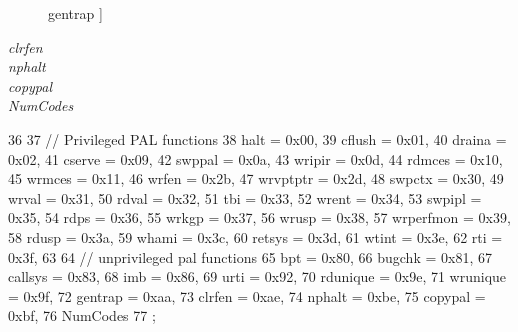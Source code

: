 \begin{Desc}
\begin{description}
{\hypertarget{structPAL_adf764cbdea00d65edcd07bb9953ad2b7a0ea5dc9a2948c3bcfb2a620bfd363503}{
gentrap}
\label{structPAL_adf764cbdea00d65edcd07bb9953ad2b7a0ea5dc9a2948c3bcfb2a620bfd363503}
}]\item[{\em 
\hypertarget{structPAL_adf764cbdea00d65edcd07bb9953ad2b7ae88ccf59a847278280a49eb4d9db613f}{
clrfen}
\label{structPAL_adf764cbdea00d65edcd07bb9953ad2b7ae88ccf59a847278280a49eb4d9db613f}
}]\item[{\em 
\hypertarget{structPAL_adf764cbdea00d65edcd07bb9953ad2b7ae8176a94c597d07e06974a88fa49f0db}{
nphalt}
\label{structPAL_adf764cbdea00d65edcd07bb9953ad2b7ae8176a94c597d07e06974a88fa49f0db}
}]\item[{\em 
\hypertarget{structPAL_adf764cbdea00d65edcd07bb9953ad2b7a1409cfe014ada6068553b669c0f6af5c}{
copypal}
\label{structPAL_adf764cbdea00d65edcd07bb9953ad2b7a1409cfe014ada6068553b669c0f6af5c}
}]\item[{\em 
\hypertarget{structPAL_adf764cbdea00d65edcd07bb9953ad2b7ae08c8ca254e0a08fa5478db2ceadfeaf}{
NumCodes}
\label{structPAL_adf764cbdea00d65edcd07bb9953ad2b7ae08c8ca254e0a08fa5478db2ceadfeaf}
}]\end{description}
\end{Desc}




\begin{DoxyCode}
36          {
37         // Privileged PAL functions
38         halt = 0x00,
39         cflush = 0x01,
40         draina = 0x02,
41         cserve = 0x09,
42         swppal = 0x0a,
43         wripir = 0x0d,
44         rdmces = 0x10,
45         wrmces = 0x11,
46         wrfen = 0x2b,
47         wrvptptr = 0x2d,
48         swpctx = 0x30,
49         wrval = 0x31,
50         rdval = 0x32,
51         tbi = 0x33,
52         wrent = 0x34,
53         swpipl = 0x35,
54         rdps = 0x36,
55         wrkgp = 0x37,
56         wrusp = 0x38,
57         wrperfmon = 0x39,
58         rdusp = 0x3a,
59         whami = 0x3c,
60         retsys = 0x3d,
61         wtint = 0x3e,
62         rti = 0x3f,
63 
64         // unprivileged pal functions
65         bpt = 0x80,
66         bugchk = 0x81,
67         callsys = 0x83,
68         imb = 0x86,
69         urti = 0x92,
70         rdunique = 0x9e,
71         wrunique = 0x9f,
72         gentrap = 0xaa,
73         clrfen = 0xae,
74         nphalt = 0xbe,
75         copypal = 0xbf,
76         NumCodes
77     };
\end{DoxyCode}



